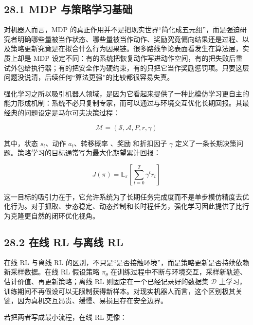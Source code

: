 \subsection*{28.1 MDP 与策略学习基础}


对机器人而言，MDP 的真正作用并不是把现实世界“简化成五元组”，而是强迫研究者明确哪些量被当作状态、哪些量被当作动作、奖励究竟偏向结果还是过程、以及策略更新究竟是在拟合什么行为因果链。很多路线争论表面看发生在算法层，实质上却是 MDP 设定不同：有的系统把恢复动作写进动作空间，有的把失败后重试外包给执行器；有的把安全作为硬约束，有的只把它当作奖励惩罚项。只要这层问题没说清，后续任何“算法更强”的比较都很容易失真。

强化学习之所以吸引机器人领域，是因为它看起来提供了一种比模仿学习更自主的能力形成机制：系统不必只复制专家，而可以通过与环境交互优化长期回报。其最经典的问题设定是马尔可夫决策过程：

\begin{equation*}
\mathcal{M} = (\mathcal{S}, \mathcal{A}, P, r, \gamma)
\end{equation*}

其中，状态 \(s_t\)、动作 \(a_t\)、转移概率 \texttt{}、奖励 \texttt{} 和折扣因子 \(\gamma\) 定义了一条长期决策问题。策略学习的目标通常写为最大化期望累计回报：

\begingroup
\footnotesize
\begin{equation*}
J(\pi) = \mathbb{E}_{\pi}\left[\sum_{t=0}^{T} \gamma^t r_t \right]
\end{equation*}
\endgroup

这一目标的吸引力在于，它允许系统为了长期任务完成度而不是单步模仿精度去优化行为。对于抓取、步态稳定、动态控制和长时程任务，强化学习因此提供了比行为克隆更自然的闭环优化视角。

\subsection*{28.2 在线 RL 与离线 RL}


在线 RL 与离线 RL 的区别，不只是“是否接触环境”，而是策略更新是否持续依赖新采样数据。在线 RL 假设策略 \(\pi_\theta\) 在训练过程中不断与环境交互，采样新轨迹、估计价值、再更新策略；离线 RL 则固定在一个已经记录好的数据集 \(\mathcal{D}\) 上学习，训练期间不再假设可以无限制获得新样本。对现实机器人而言，这个区别极其关键，因为真机交互昂贵、缓慢、易损且存在安全边界。

若把两者写成最小流程，在线 RL 更像：

